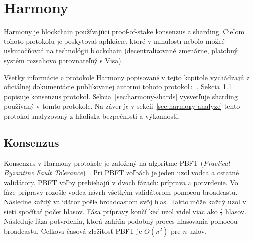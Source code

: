 \chapter{Harmony}\label{chap:harmony}

Harmony je blockchain používajúci proof-of-stake konsenzus a sharding. Cieľom tohoto protokolu je poskytovať aplikácie, ktoré v minulosti nebolo možné uskutočňovať na technológii blockchain (decentralizované zmenárne, platobný systém rozsahovo porovnateľný s Visa).

Všetky informácie o protokole Harmony popisované v tejto kapitole vychádzajú z oficiálnej dokumentácie publikovanej autormi tohoto protokolu~\cite{harmonyWp}. Sekcia~\ref{sec:harmony-cons} popisuje konsenzus protokol. Sekcia~\ref{sec:harmony-shards} vysvetľuje sharding používaný v tomto protokole.  Na záver je v sekcii~\ref{sec:harmony-analyze} tento protokol analyzovaný z hľadiska bezpečnosti a výkonnosti.

\section{Konsenzus}\label{sec:harmony-cons}

Konsenzus v Harmony protokole je založený na algoritme PBFT (\textit{Practical Byzantine Fault Tolerance})~\cite{pbftCastro}. Pri PBFT voľbách je jeden uzol vodca a ostatné validátory. PBFT voľby prebiehajú v dvoch fázach: príprava a potvrdenie. Vo fáze prípravy rozošle vodca návrh všetkým validátorom pomocou broadcastu. Následne každý validátor pošle broadcastom svôj hlas. Takto môže každý uzol v sieti spočítať počet hlasov. Fáza prípravy končí keď uzol videl viac ako $\frac{2}{3}$ hlasov. Následuje fáza potvrdenia, ktorá zahŕňa podobný proces hlasovania pomocou broadcastu. Celková časová zložitosť PBFT je $O(n^2)$ pre $n$ uzlov.


